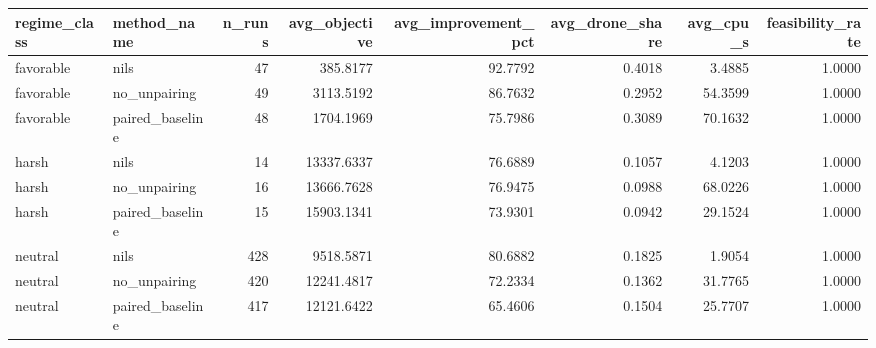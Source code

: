 \begin{tabular}{llrrrrrr}
\toprule
regime_class & method_name & n_runs & avg_objective & avg_improvement_pct & avg_drone_share & avg_cpu_s & feasibility_rate \\
\midrule
favorable & nils & 47 & 385.8177 & 92.7792 & 0.4018 & 3.4885 & 1.0000 \\
favorable & no_unpairing & 49 & 3113.5192 & 86.7632 & 0.2952 & 54.3599 & 1.0000 \\
favorable & paired_baseline & 48 & 1704.1969 & 75.7986 & 0.3089 & 70.1632 & 1.0000 \\
harsh & nils & 14 & 13337.6337 & 76.6889 & 0.1057 & 4.1203 & 1.0000 \\
harsh & no_unpairing & 16 & 13666.7628 & 76.9475 & 0.0988 & 68.0226 & 1.0000 \\
harsh & paired_baseline & 15 & 15903.1341 & 73.9301 & 0.0942 & 29.1524 & 1.0000 \\
neutral & nils & 428 & 9518.5871 & 80.6882 & 0.1825 & 1.9054 & 1.0000 \\
neutral & no_unpairing & 420 & 12241.4817 & 72.2334 & 0.1362 & 31.7765 & 1.0000 \\
neutral & paired_baseline & 417 & 12121.6422 & 65.4606 & 0.1504 & 25.7707 & 1.0000 \\
\bottomrule
\end{tabular}
